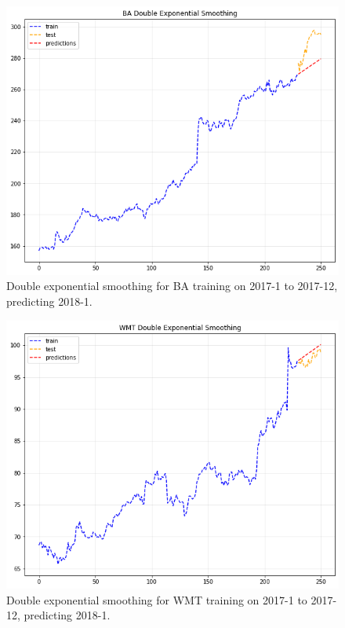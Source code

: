 \documentclass[11pt]{article}
\begin{document}
\begin{figure}[h!]
\centerline{\includegraphics[scale=0.5]{des_2.png}}
\caption{Double exponential smoothing for BA training on 2017-1 to 2017-12, predicting 2018-1.}
\end{figure}

\begin{figure}[h!]
\centerline{\includegraphics[scale=0.5]{des_3.png}}
\caption{Double exponential smoothing for WMT training on 2017-1 to 2017-12, predicting 2018-1.}
\end{figure}

\newpage
\end{document}
